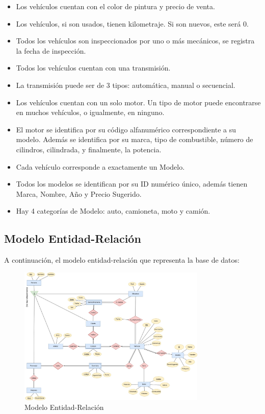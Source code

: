 \documentclass[12pt]{article}
\begin{document}
\begin{itemize}
\item Los vehículos cuentan con el color de pintura y precio de venta.
\item Los vehículos, si son usados, tienen kilometraje. Si son nuevos, este será 0.
\item Todos los vehículos son inspeccionados por uno o más mecánicos, se registra la fecha de inspección.
\item Todos los vehículos cuentan con una transmisión.
\item La transmisión puede ser de 3 tipos: automática, manual o secuencial.
\item Los vehículos cuentan con un solo motor. Un tipo de motor puede encontrarse en muchos vehículos, o igualmente, en ninguno.
\item El motor se identifica por su código alfanumérico correspondiente a su modelo. Además se identifica por su marca, tipo de combustible, número de cilindros, cilindrada, y finalmente, la potencia.
\item Cada vehículo corresponde a exactamente un Modelo.
\item Todos los modelos se identifican por su ID numérico único, además tienen Marca, Nombre, Año y Precio Sugerido.
\item Hay 4 categorías de Modelo: auto, camioneta, moto y camión.
\end{itemize}

\subsection{Modelo Entidad-Relaci\'on}

A continuación, el modelo entidad-relación que representa la base de datos:

\begin{figure}
\centering
\includegraphics[width=0.8\textwidth]{ER.jpg}
\caption{Modelo Entidad-Relación}
\end{figure}
\end{document}

